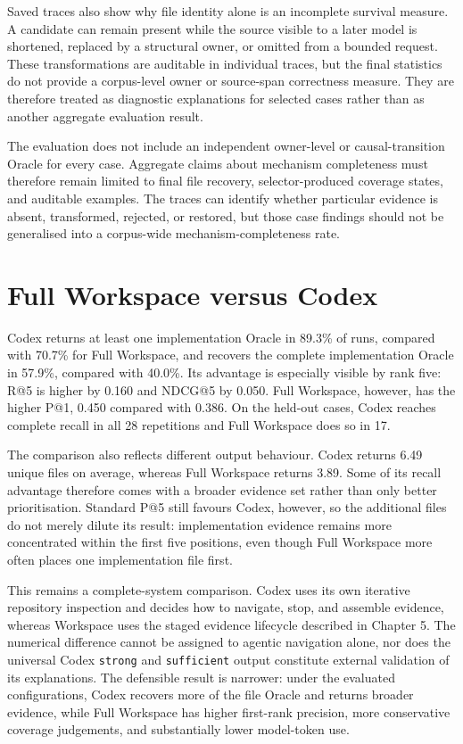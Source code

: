 Saved traces also show why file identity alone is an incomplete survival measure. A candidate can remain present while the source visible to a later model is shortened, replaced by a structural owner, or omitted from a bounded request. These transformations are auditable in individual traces, but the final statistics do not provide a corpus-level owner or source-span correctness measure. They are therefore treated as diagnostic explanations for selected cases rather than as another aggregate evaluation result.

The evaluation does not include an independent owner-level or causal-transition Oracle for every case. Aggregate claims about mechanism completeness must therefore remain limited to final file recovery, selector-produced coverage states, and auditable examples. The traces can identify whether particular evidence is absent, transformed, rejected, or restored, but those case findings should not be generalised into a corpus-wide mechanism-completeness rate.

\section{Full Workspace versus Codex}\label{sec:full-workspace-versus-codex}

Codex returns at least one implementation Oracle in 89.3\% of runs, compared with 70.7\% for Full Workspace, and recovers the complete implementation Oracle in 57.9\%, compared with 40.0\%. Its advantage is especially visible by rank five: R@5 is higher by 0.160 and NDCG@5 by 0.050. Full Workspace, however, has the higher P@1, 0.450 compared with 0.386. On the held-out cases, Codex reaches complete recall in all 28 repetitions and Full Workspace does so in 17.

The comparison also reflects different output behaviour. Codex returns 6.49 unique files on average, whereas Full Workspace returns 3.89. Some of its recall advantage therefore comes with a broader evidence set rather than only better prioritisation. Standard P@5 still favours Codex, however, so the additional files do not merely dilute its result: implementation evidence remains more concentrated within the first five positions, even though Full Workspace more often places one implementation file first.

This remains a complete-system comparison. Codex uses its own iterative repository inspection and decides how to navigate, stop, and assemble evidence, whereas Workspace uses the staged evidence lifecycle described in Chapter 5. The numerical difference cannot be assigned to agentic navigation alone, nor does the universal Codex \texttt{strong} and \texttt{sufficient} output constitute external validation of its explanations. The defensible result is narrower: under the evaluated configurations, Codex recovers more of the file Oracle and returns broader evidence, while Full Workspace has higher first-rank precision, more conservative coverage judgements, and substantially lower model-token use.

